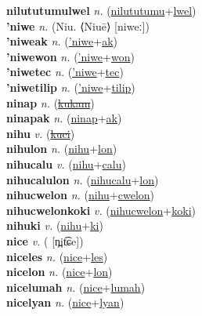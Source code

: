\textbf{nilututumulwel} \textit{n.} (\hyperref[nilututumu]{nilututumu}+\hyperref[lwel]{lwel})
 \label{nilututumulwel} \\
\textbf{'niwe} \textit{n.} (Niu. ⟨Niuē⟩ [niweː])
 \label{'niwe} \\
\textbf{'niweak} \textit{n.} (\hyperref['niwe]{'niwe}+\hyperref[ak]{ak})
 \label{'niweak} \\
\textbf{'niwewon} \textit{n.} (\hyperref['niwe]{'niwe}+\hyperref[won]{won})
 \label{'niwewon} \\
\textbf{'niwetec} \textit{n.} (\hyperref['niwe]{'niwe}+\hyperref[tec]{tec})
 \label{'niwetec} \\
\textbf{'niwetilip} \textit{n.} (\hyperref['niwe]{'niwe}+\hyperref[tilip]{tilip})
 \label{'niwetilip} \\
\textbf{ninap} \textit{n.} (\hyperref[kukam]{\sout{kukam}})
 \label{ninap} \\
\textbf{ninapak} \textit{n.} (\hyperref[ninap]{ninap}+\hyperref[ak]{ak})
 \label{ninapak} \\
\textbf{nihu} \textit{v.} (\hyperref[kuci]{\sout{kuci}})
 \label{nihu} \\
\textbf{nihulon} \textit{n.} (\hyperref[nihu]{nihu}+\hyperref[lon]{lon})
 \label{nihulon} \\
\textbf{nihucalu} \textit{v.} (\hyperref[nihu]{nihu}+\hyperref[calu]{calu})
 \label{nihucalu} \\
\textbf{nihucalulon} \textit{n.} (\hyperref[nihucalu]{nihucalu}+\hyperref[lon]{lon})
 \label{nihucalulon} \\
\textbf{nihucwelon} \textit{n.} (\hyperref[nihu]{nihu}+\hyperref[cwelon]{cwelon})
 \label{nihucwelon} \\
\textbf{nihucwelonkoki} \textit{v.} (\hyperref[nihucwelon]{nihucwelon}+\hyperref[koki]{koki})
 \label{nihucwelonkoki} \\
\textbf{nihuki} \textit{v.} (\hyperref[nihu]{nihu}+\hyperref[ki]{ki})
 \label{nihuki} \\
\textbf{nice} \textit{v.} ( [n̪it͡ɕe])
 \label{nice} \\
\textbf{niceles} \textit{n.} (\hyperref[nice]{nice}+\hyperref[les]{les})
 \label{niceles} \\
\textbf{nicelon} \textit{n.} (\hyperref[nice]{nice}+\hyperref[lon]{lon})
 \label{nicelon} \\
\textbf{nicelumah} \textit{n.} (\hyperref[nice]{nice}+\hyperref[lumah]{lumah})
 \label{nicelumah} \\
\textbf{nicelyan} \textit{n.} (\hyperref[nice]{nice}+\hyperref[lyan]{lyan})
